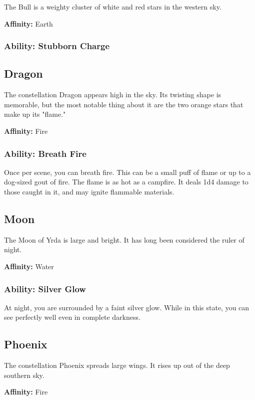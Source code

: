 \begin{multicols}{2}
The Bull is a weighty cluster of white and red stars in
the western sky.

\textbf{Affinity:} Earth

\subsubsection{Ability: Stubborn Charge}

\subsection{Dragon}

The constellation Dragon appears high in the sky. Its twisting
shape is memorable, but the most notable thing about it are
the two orange stars that make up its "flame."

\textbf{Affinity:} Fire

\subsubsection{Ability: Breath Fire}

Once per scene, you can breath fire. This can be a small puff of flame
or up to a dog-sized gout of fire. The flame is as hot as a campfire. It
deals 1d4 damage to those caught in it, and may ignite flammable
materials.

\subsection{Moon}

The Moon of Yrda is large and bright. It has long been considered
the ruler of night.

\textbf{Affinity:} Water

\subsubsection{Ability: Silver Glow}

At night, you are surrounded by a faint silver glow. While in this state,
you can see perfectly well even in complete darkness.

\subsection{Phoenix}

The constellation Phoenix spreads large wings. It rises up out of the
deep southern sky.

\textbf{Affinity:} Fire


\end{multicols}
